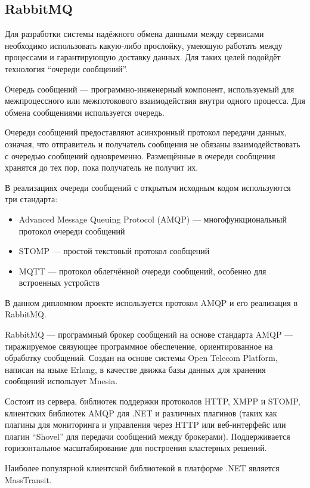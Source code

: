 \subsection{RabbitMQ}

Для разработки системы надёжного обмена данными между сервисами необходимо использовать какую-либо прослойку, умеющую работать между процессами и гарантирующую доставку данных. Для таких целей подойдёт технология ``очереди сообщений''.

Очередь сообщений — программно-инженерный компонент, используемый для межпроцессного или межпотокового взаимодействия внутри одного процесса. Для обмена сообщениями используется очередь.

Очереди сообщений предоставляют асинхронный протокол передачи данных, означая, что отправитель и получатель сообщения не обязаны взаимодействовать с очередью сообщений одновременно. Размещённые в очереди сообщения хранятся до тех пор, пока получатель не получит их.

В реализациях очереди сообщений с открытым исходным кодом используются три стандарта:

\begin{itemize}
    \item Advanced Message Queuing Protocol (AMQP) — многофункциональный протокол очереди сообщений
    \item STOMP  — простой текстовый протокол сообщений
    \item MQTT — протокол облегчённой очереди сообщений, особенно для встроенных устройств
\end{itemize}

В данном дипломном проекте используется протокол AMQP и его реализация в RabbitMQ.

RabbitMQ — программный брокер сообщений на основе стандарта AMQP — тиражируемое связующее программное обеспечение, ориентированное на обработку сообщений. Создан на основе системы Open Telecom Platform, написан на языке Erlang, в качестве движка базы данных для хранения сообщений использует Mnesia.

Состоит из сервера, библиотек поддержки протоколов HTTP, XMPP и STOMP, клиентских библиотек AMQP для .NET и различных плагинов (таких как плагины для мониторинга и управления через HTTP или веб-интерфейс или плагин ``Shovel'' для передачи сообщений между брокерами). Поддерживается горизонтальное масштабирование для построения кластерных решений.

Наиболее популярной клиентской библиотекой в платформе .NET является MassTransit.

